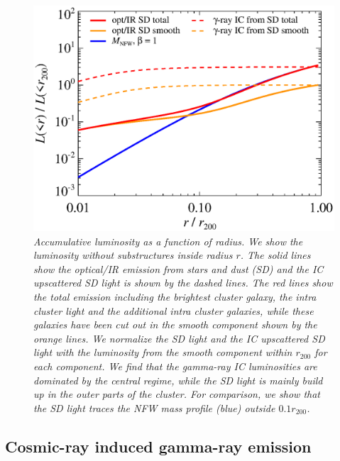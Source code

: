 \documentclass[10pt,aps,pra,reprint,amsmath,amsfonts,amssymb,showpacs,nofootinbib,floatfix]{revtex4-1}
\newcommand{\rvir}{r_{200}}
\begin{document}
\begin{figure}%
 \includegraphics[width=0.99\columnwidth]{figures/lum.stars.eps}
 \caption{\it Accumulative luminosity as a function of radius. We show
   the luminosity without substructures inside radius $r$. The solid
   lines show the optical/IR emission from stars and dust (SD) and the
   IC upscattered SD light is shown by the dashed lines. The red lines
   show the total emission including the brightest cluster galaxy, the
   intra cluster light and the additional intra cluster galaxies,
   while these galaxies have been cut out in the smooth component
   shown by the orange lines. We normalize the SD light and the IC
   upscattered SD light with the luminosity from the smooth component
   within $\rvir$ for each component. We find that the gamma-ray IC
   luminosities are dominated by the central regime, while the SD
   light is mainly build up in the outer parts of the cluster. For
   comparison, we show that the SD light traces the NFW mass profile
   (blue) outside  $0.1\rvir$.}
 \label{fig:SD_lum}
\end{figure}


\subsection{Cosmic-ray induced gamma-ray emission}
\label{sect:CRs}
\end{document}
